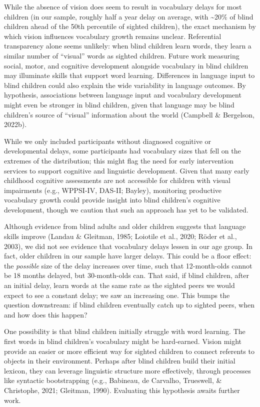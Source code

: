 \documentclass[
  man,floatsintext]{apa6}
\begin{document}
While the absence of vision does seem to result in vocabulary delays for most children (in our sample, roughly half a year delay on average, with \textasciitilde20\% of blind children ahead of the 50th percentile of sighted children), the exact mechanism by which vision influences vocabulary growth remains unclear. Referential transparency alone seems unlikely: when blind children learn words, they learn a similar number of ``visual'' words as sighted children. Future work measuring social, motor, and cognitive development alongside vocabulary in blind children may illuminate skills that support word learning. Differences in language input to blind children could also explain the wide variability in language outcomes. By hypothesis, associations between language input and vocabulary development might even be stronger in blind children, given that language may be blind children's source of ``visual'' information about the world (Campbell \& Bergelson, 2022b).

While we only included participants without diagnosed cognitive or developmental delays, some participants had vocabulary sizes that fell on the extremes of the distribution; this might flag the need for early intervention services to support cognitive and linguistic development. Given that many early childhood cognitive assessments are not accessible for children with visual impairments (e.g., WPPSI-IV, DAS-II; Bayley), monitoring productive vocabulary growth could provide insight into blind children's cognitive development, though we caution that such an approach has yet to be validated.

Although evidence from blind adults and older children suggests that language skills improve (Landau \& Gleitman, 1985; Loiotile et al., 2020; Röder et al., 2003), we did not see evidence that vocabulary delays lessen in our age group. In fact, older children in our sample have larger delays. This could be a floor effect: the \emph{possible} size of the delay increases over time, such that 12-month-olds cannot be 18 months delayed, but 30-month-olds can. That said, if blind children, after an initial delay, learn words at the same rate as the sighted peers we would expect to see a constant delay; we saw an increasing one. This bumps the question downstream: if blind children eventually catch up to sighted peers, when and how does this happen?

One possibility is that blind children initially struggle with word learning. The first words in blind children's vocabulary might be hard-earned. Vision might provide an easier or more efficient way for sighted children to connect referents to objects in their environment. Perhaps after blind children build their initial lexicon, they can leverage linguistic structure more effectively, through processes like syntactic bootstrapping (e.g., Babineau, de Carvalho, Trueswell, \& Christophe, 2021; Gleitman, 1990). Evaluating this hypothesis awaits further work.
\end{document}
